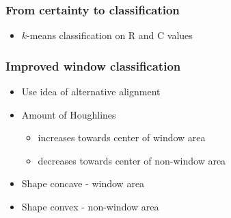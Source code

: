 \documentclass{beamer}
\begin{document}
\frame
{
	\frametitle{From certainty to classification}
	\begin{itemize}
	\item <+-| alert@+> $k$-means classification on R and C values

	\end{itemize}
}

\frame
{
}

\frame
{
}

\frame
{
}

\frame
{
	\frametitle{Improved window classification}
	\begin{itemize}
	\item <+-| alert@+> Use idea of alternative alignment
	\item <+-| alert@+> Amount of Houghlines 
		\begin{itemize}
		\item <+-| alert@+> increases towards center of window area
		\item <+-| alert@+> decreases towards center of non-window area
		\end{itemize}
	\item <+-| alert@+> Shape concave - window area
	\item <+-| alert@+> Shape convex - non-window area
	\end{itemize}
}
\frame
{
}

\end{document}
